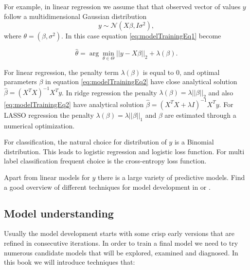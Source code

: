 \documentclass[12pt,]{krantz}
\begin{document}
For example, in linear regression we assume that that observed vector of values \(y\) follow a multidimensional Gaussian distribution
\[
y \sim \mathcal N(X \beta, I\sigma^2),
\]
where \(\theta = (\beta, \sigma^2)\). In this case equation \eqref{eq:modelTrainingEq1} become

\begin{equation}
\hat\theta = \arg \min_{\theta \in \Theta}  ||y - X \beta||_{2} + \lambda(\beta). 
\label{eq:modelTrainingEq2}
\end{equation}

For linear regression, the penalty term \(\lambda(\beta)\) is equal to \(0\), and optimal parameters \(\beta\) in equation \eqref{eq:modelTrainingEq2} have close analytical solution \(\hat \beta = (X^TX)^{-1}X^Ty\). In ridge regression the penalty \(\lambda(\beta) = \lambda ||\beta||_2\) and also \eqref{eq:modelTrainingEq2} have analytical solution \(\hat \beta = (X^TX + \lambda I)^{-1}X^Ty\). For LASSO regression the penalty \(\lambda(\beta) = \lambda ||\beta||_1\) and \(\beta\) are estimated through a numerical optimization.

For classification, the natural choice for distribution of \(y\) is a Binomial distribution. This leads to logistic regression and logistic loss function. For multi label classification frequent choice is the cross-entropy loss function.

Apart from linear models for \(y\) there is a large variety of predictive models. Find a good overview of different techniques for model development in \citep{Venables2010} or \citep{AppliedPredictiveModeling2013}.

\hypertarget{model-understanding}{%
\subsection{Model understanding}\label{model-understanding}}

Usually the model development starts with some crisp early versions that are refined in consecutive iterations. In order to train a final model we need to try numerous candidate models that will be explored, examined and diagnosed. In this book we will introduce techniques that:
\end{document}
